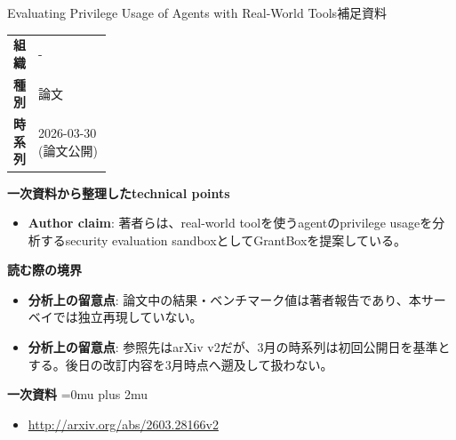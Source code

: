 \begin{technicalnote}{Evaluating Privilege Usage of Agents with Real-World Tools}{補足資料}
\begingroup
\begin{tabularx}{\linewidth}{@{}>{\bfseries}p{0.22\linewidth}X@{}}
組織 & - \\
種別 & 論文 \\
時系列 & 2026-03-30 (論文公開) \\
\end{tabularx}
\smallskip
{\bfseries 一次資料から整理したtechnical points}
\begin{itemize}[leftmargin=1.5em,itemsep=0.35em]
\item \textbf{Author claim}: 著者らは、real-world toolを使うagentのprivilege usageを分析するsecurity evaluation sandboxとしてGrantBoxを提案している。
\end{itemize}
\begin{minipage}{\linewidth}
{\bfseries 読む際の境界}
\begin{itemize}[leftmargin=1.5em,itemsep=0.35em]
\item \textbf{分析上の留意点}: 論文中の結果・ベンチマーク値は著者報告であり、本サーベイでは独立再現していない。
\item \textbf{分析上の留意点}: 参照先はarXiv v2だが、3月の時系列は初回公開日を基準とする。後日の改訂内容を3月時点へ遡及して扱わない。
\end{itemize}
\begin{samepage}
{\bfseries 一次資料}
\begingroup\sloppy
\Urlmuskip=0mu plus 2mu\relax
\begin{itemize}[leftmargin=1.5em,itemsep=0.25em]
\item {\scriptsize\url{http://arxiv.org/abs/2603.28166v2}}
\end{itemize}
\endgroup
\end{samepage}
\end{minipage}
\endgroup
\end{technicalnote}
\medskip

